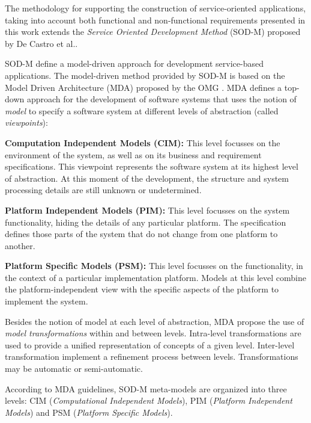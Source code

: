 
The methodology for supporting the construction of service-oriented applications, taking into account both functional and non-functional requirements presented in this work extends the \textit{Service Oriented Development Method} (SOD-M) proposed by De Castro et al.\cite{decastro1}.

SOD-M define a model-driven approach for development service-based applications. The model-driven method provided by SOD-M is based on the Model Driven Architecture (MDA) proposed by the OMG \cite{miller}. MDA defines a top-down approach for the development of software systems that uses the notion of \textit{model} to specify a software system at different levels of abstraction (called \textit{viewpoints}):

\begin{trivlist}
\item \textbf{Computation Independent Models (CIM):} This level focusses on the
environment of the system, as well as on its business and requirement specifications.
This viewpoint represents the software system at its highest level of abstraction.
At this moment of the development, the structure and system processing details are still unknown or undetermined.

\item \textbf{Platform Independent Models (PIM):} This level focusses on the system functionality, hiding the details of any particular platform.
The specification defines those parts of the system that do not change from one platform to another.

\item \textbf{Platform Specific Models (PSM):} This level focusses on the functionality, in the context of a particular implementation platform.
Models at this level combine the platform-independent view with the specific aspects of the platform to implement the system.
\end{trivlist}

Besides the notion of model at each level of abstraction, MDA propose the use of \textit{model transformations} within and between levels. Intra-level transformations are used to provide a unified representation of concepts of a given level. Inter-level transformation implement a refinement process between levels. Transformations may be automatic or semi-automatic.

According to MDA guidelines, SOD-M meta-models are organized into three levels: CIM (\textit{Computational Independent Models}), PIM (\textit{Platform Independent Models}) and PSM (\textit{Platform Specific Models}).

